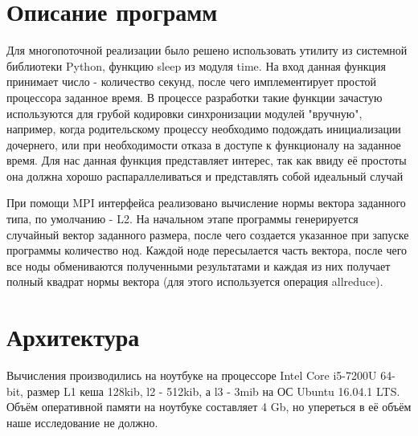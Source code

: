 \documentclass[12pt]{report}
\begin{document}
\chapter*{Описание программ}
\par Для многопоточной реализации было решено использовать утилиту из системной библиотеки Python, функцию sleep из модуля time. На вход данная функция принимает число - количество секунд, после чего имплементирует простой процессора заданное время. В процессе разработки такие функции зачастую используются для грубой кодировки синхронизации модулей "вручную", например, когда родительскому процессу необходимо подождать инициализации дочернего, или при необходимости отказа в доступе к функционалу на заданное время. Для нас данная функция представляет интерес, так как ввиду её простоты она должна хорошо распараллеливаться и представлять собой идеальный случай
\par При помощи MPI интерфейса реализовано вычисление нормы вектора заданного типа, по умолчанию - L2. На начальном этапе программы генерируется случайный вектор заданного размера, после чего создается указанное при запуске программы количество нод. Каждой ноде пересылается часть вектора, после чего все ноды обмениваются полученными результатами и каждая из них получает полный квадрат нормы вектора (для этого используется операция allreduce).

\chapter*{Архитектура}
\par Вычисления производились на ноутбуке на процессоре Intel Core i5-7200U 64-bit, размер L1 кеша 128kib, l2 - 512kib, а l3 - 3mib на ОС Ubuntu 16.04.1 LTS. Объём оперативной памяти на ноутбуке составляет 4 Gb, но упереться в её объём наше исследование не должно.
\end{document}
